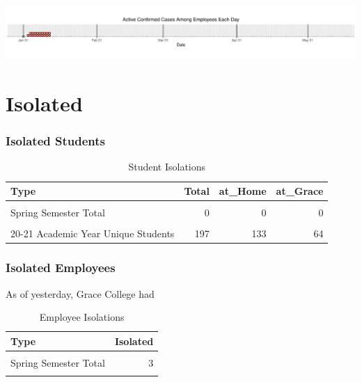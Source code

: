 \documentclass[
]{article}
\begin{document}
\includegraphics{Grace_internal4_files/figure-latex/unnamed-chunk-5-1.pdf}

\newpage

\hypertarget{isolated}{%
\section{Isolated}\label{isolated}}

\hypertarget{isolated-students}{%
\subsubsection{Isolated Students}\label{isolated-students}}

\begin{table}[!h]

\caption{\label{tab:unnamed-chunk-6}Student Isolations}
\centering
\begin{tabular}[t]{lrrr}
\toprule
Type & Total & at\_Home & at\_Grace\\
\midrule
\cellcolor{gray!6}{Active on Tue Jan 12} & \cellcolor{gray!6}{0} & \cellcolor{gray!6}{0} & \cellcolor{gray!6}{0}\\
Spring Semester Total & 0 & 0 & 0\\
\cellcolor{gray!6}{20-21 Academic Year Total} & \cellcolor{gray!6}{204} & \cellcolor{gray!6}{140} & \cellcolor{gray!6}{64}\\
20-21 Academic Year Unique Students & 197 & 133 & 64\\
\bottomrule
\end{tabular}
\end{table}

\hypertarget{isolated-employees}{%
\subsubsection{Isolated Employees}\label{isolated-employees}}

As of yesterday, Grace College had

\begin{table}[!h]

\caption{\label{tab:unnamed-chunk-8}Employee Isolations}
\centering
\begin{tabular}[t]{lr}
\toprule
Type & Isolated\\
\midrule
\cellcolor{gray!6}{Active on Tue Jan 12} & \cellcolor{gray!6}{3}\\
Spring Semester Total & 3\\
\cellcolor{gray!6}{20-21 Academic Year Total} & \cellcolor{gray!6}{55}\\
\bottomrule
\end{tabular}
\end{table}
\end{document}
